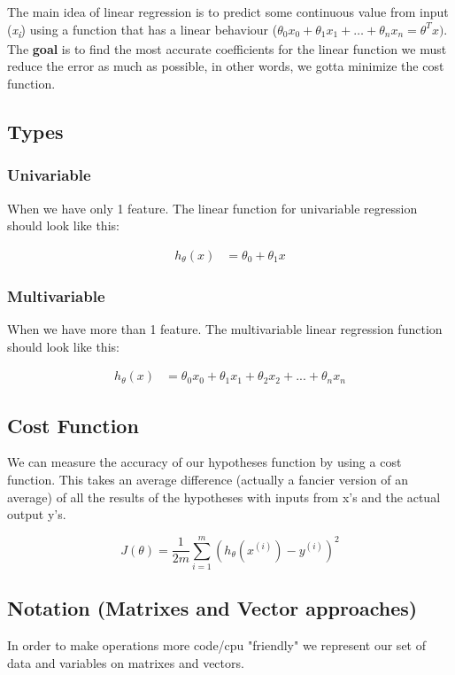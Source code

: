 The main idea of linear regression is to predict some continuous value from input (\textit{x\textsubscript{i}}) using a function that has a linear behaviour ($\theta_0x_0 + \theta_1x_1 + \hdots + \theta_nx_n = \theta^Tx)$. The \textbf{goal} is to find the most accurate coefficients for the linear function we must reduce the error as much as possible, in other words, we gotta minimize the cost function.

\subsection{Types}
\subsubsection{Univariable}
When we have only 1 feature. The linear function for univariable regression should look like this:

\begin{align}
	h_{\theta}(x) & = \theta_{0} + \theta_{1}x
\end{align}

\subsubsection{Multivariable}
When we have more than 1 feature. The multivariable linear regression function should look like this:

\begin{align}
	h_{\theta}(x) & = \theta_{0}x_{0} + \theta_{1}x_{1} + \theta_{2}x_{2} + ... + \theta_{n}x_{n}
\end{align}

\subsection{Cost Function}
We can measure the accuracy of our hypotheses function by using a cost function. This takes an average difference (actually a fancier version of an average) of all the results of the hypotheses with inputs from x's and the actual output y's.

$$J(\theta) = \frac{1}{2m}\sum_{i=1}^{m} (h_{\theta}(x^{(i)}) - y^{(i)})^2$$

\subsection{Notation (Matrixes and Vector approaches)}
In order to make operations more code/cpu "friendly" we represent our set of data and variables on matrixes and vectors.

